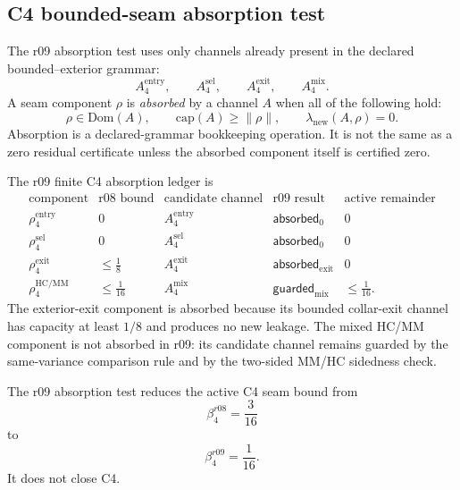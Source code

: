 \subsection{C4 bounded-seam absorption test}
\label{subsec:v470-r09-c4-bounded-seam-absorption-test}

\begin{definition}
\label{def:v470-r09-c4-absorption-channels}
The r09 absorption test uses only channels already present in the declared
bounded--exterior grammar:
\[
A_4^{\mathrm{entry}},\qquad
A_4^{\mathrm{sel}},\qquad
A_4^{\mathrm{exit}},\qquad
A_4^{\mathrm{mix}}.
\]
A seam component \(\rho\) is \emph{absorbed} by a channel \(A\) when all of the
following hold:
\[
\rho\in\mathrm{Dom}(A),\qquad
\mathrm{cap}(A)\geq \|\rho\|,
\qquad
\lambda_{\mathrm{new}}(A,\rho)=0.
\]
Absorption is a declared-grammar bookkeeping operation.  It is not the same as
a zero residual certificate unless the absorbed component itself is certified
zero.
\end{definition}

\begin{definition}
\label{def:v470-r09-c4-absorption-ledger}
The r09 finite C4 absorption ledger is
\[
\begin{array}{c|c|c|c|c}
\text{component} & \text{r08 bound} & \text{candidate channel} & \text{r09 result} & \text{active remainder}\\
\hline
\rho_{4}^{\mathrm{entry}} & 0 & A_4^{\mathrm{entry}} & \mathsf{absorbed}_0 & 0\\
\rho_{4}^{\mathrm{sel}} & 0 & A_4^{\mathrm{sel}} & \mathsf{absorbed}_0 & 0\\
\rho_{4}^{\mathrm{exit}} & \leq\tfrac18 & A_4^{\mathrm{exit}} & \mathsf{absorbed}_{\mathrm{exit}} & 0\\
\rho_{4}^{\mathrm{HC/MM}} & \leq\tfrac1{16} & A_4^{\mathrm{mix}} & \mathsf{guarded}_{\mathrm{mix}} & \leq\tfrac1{16}.
\end{array}
\]
The exterior-exit component is absorbed because its bounded collar-exit channel
has capacity at least \(1/8\) and produces no new leakage.  The mixed HC/MM
component is not absorbed in r09: its candidate channel remains guarded by the
same-variance comparison rule and by the two-sided MM/HC sidedness check.
\end{definition}

\begin{lemma}
\label{lem:v470-r09-partial-c4-absorption}
The r09 absorption test reduces the active C4 seam bound from
\[
\beta_4^{r08}=\frac3{16}
\]
to
\[
\beta_4^{r09}=\frac1{16}.
\]
It does not close C4.
\end{lemma}

